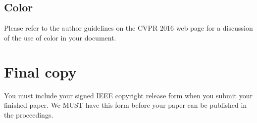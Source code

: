 \documentclass[10pt,twocolumn,letterpaper]{article}
\begin{document}
\subsection{Color}

Please refer to the author guidelines on the CVPR 2016 web page for a discussion
of the use of color in your document.

\section{Final copy}

You must include your signed IEEE copyright release form when you submit
your finished paper. We MUST have this form before your paper can be
published in the proceedings.


{\small


}
\end{document}
